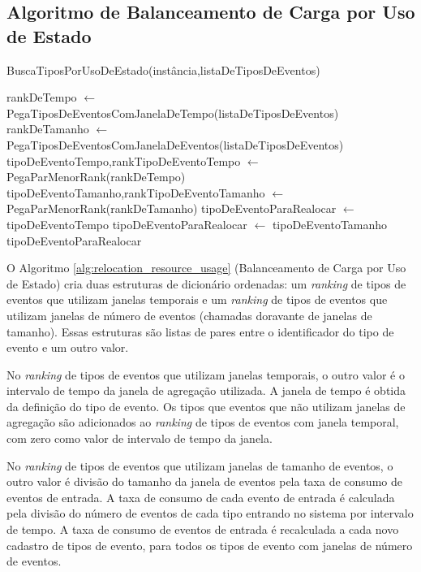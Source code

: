 \subsection{Algoritmo de Balanceamento de Carga por Uso de Estado}
\begin{algorithm}[h!]
\caption{BuscaTiposPorUsoDeEstado(instância,listaDeTiposDeEventos)}
\label{alg:relocation_resource_usage}
\begin{algorithmic}[1]
\STATE rankDeTempo $\leftarrow$ PegaTiposDeEventosComJanelaDeTempo(listaDeTiposDeEventos) 
\STATE rankDeTamanho $\leftarrow$ PegaTiposDeEventosComJanelaDeEventos(listaDeTiposDeEventos) 
\STATE tipoDeEventoTempo,rankTipoDeEventoTempo $\leftarrow$ PegaParMenorRank(rankDeTempo)
\STATE tipoDeEventoTamanho,rankTipoDeEventoTamanho $\leftarrow$ PegaParMenorRank(rankDeTamanho)
\STATE tipoDeEventoParaRealocar $\leftarrow$ tipoDeEventoTempo
\ELSE
\STATE tipoDeEventoParaRealocar $\leftarrow$ tipoDeEventoTamanho
\ENDIF
\RETURN tipoDeEventoParaRealocar
\end{algorithmic}
\end{algorithm}

O Algoritmo \ref{alg:relocation_resource_usage} (Balanceamento de Carga por Uso de Estado) cria duas estruturas de dicionário ordenadas: um \textit{ranking} de tipos de eventos que utilizam janelas temporais e um \textit{ranking} de tipos de eventos que utilizam janelas de número de eventos (chamadas doravante de janelas de tamanho). Essas estruturas são listas de pares entre o identificador do tipo de evento e um outro valor. 

No \textit{ranking} de tipos de eventos que utilizam janelas temporais, o outro valor é o intervalo de tempo da janela de agregação utilizada. A janela de tempo é obtida da definição do tipo de evento. Os tipos que eventos que não utilizam janelas de agregação são adicionados ao \textit{ranking} de tipos de eventos com janela temporal, com zero como valor de intervalo de tempo da janela.

No \textit{ranking} de tipos de eventos que utilizam janelas de tamanho de eventos, o outro valor é divisão do tamanho da janela de eventos pela taxa de consumo de eventos de entrada. A taxa de consumo de cada evento de entrada é calculada pela divisão do número de eventos de cada tipo entrando no sistema por intervalo de tempo. A taxa de consumo de eventos de entrada é recalculada a cada novo cadastro de tipos de evento, para todos os tipos de evento com janelas de número de eventos. 

